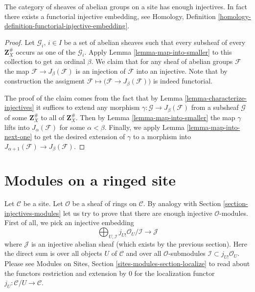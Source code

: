 \begin{theorem}
\label{theorem-sheaves-injectives}
The category of sheaves of abelian groups on a
site has enough injectives. In fact there exists
a functorial injective embedding, see
Homology, Definition \ref{homology-definition-functorial-injective-embedding}.
\end{theorem}

\begin{proof}
Let $\mathcal{G}_i$, $i \in I$ be a set of abelian
sheaves such that every subsheaf of every $\mathbf{Z}_X^\#$
occurs as one of the $\mathcal{G}_i$. Apply
Lemma \ref{lemma-map-into-smaller} to this collection to
get an ordinal $\beta$. We claim that for any sheaf of abelian
groups $\mathcal{F}$ the map $\mathcal{F} \to J_\beta(\mathcal{F})$
is an injection of $\mathcal{F}$ into an injective.
Note that by construction the assigment
$\mathcal{F} \mapsto \big(\mathcal{F} \to J_\beta(\mathcal{F})\big)$
is indeed functorial.

\medskip\noindent
The proof of the claim comes from the fact that by
Lemma \ref{lemma-characterize-injectives} it suffices to extend any
morphism $\gamma : \mathcal{G} \to J_\beta(\mathcal{F})$
from a subsheaf $\mathcal{G}$ of some $\mathbf{Z}_X^\#$ to all of
$\mathbf{Z}_X^\#$. Then by Lemma \ref{lemma-map-into-smaller} the
map $\gamma$ lifts into $J_\alpha(\mathcal{F})$ for some
$\alpha < \beta$. Finally, we apply Lemma \ref{lemma-map-into-next-one}
to get the desired extension of $\gamma$ to a morphism
into $J_{\alpha + 1}(\mathcal{F}) \to J_\beta(\mathcal{F})$.
\end{proof}






\section{Modules on a ringed site}
\label{section-sheaves-modules}

\noindent
Let $\mathcal{C}$ be a site.
Let $\mathcal{O}$ be a sheaf of rings on $\mathcal{C}$.
By analogy with Section \ref{section-injectives-modules}
let us try to prove that there are enough injective
$\mathcal{O}$-modules. First of all, we pick an injective
embedding
$$
\bigoplus\nolimits_{U, \mathcal{I}}
j_{U!}\mathcal{O}_U/\mathcal{I}
\longrightarrow
\mathcal{J}
$$
where $\mathcal{J}$ is an injective abelian sheaf (which
exists by the previous section). Here the direct sum is
over all objects $U$ of $\mathcal{C}$ and over all
$\mathcal{O}$-submodules $\mathcal{I} \subset j_{U!}\mathcal{O}_U$.
Please see
Modules on Sites, Section \ref{sites-modules-section-localize}
to read about the functors restriction and
extension by $0$ for the localization functor
$j_U : \mathcal{C}/U \to \mathcal{C}$.

